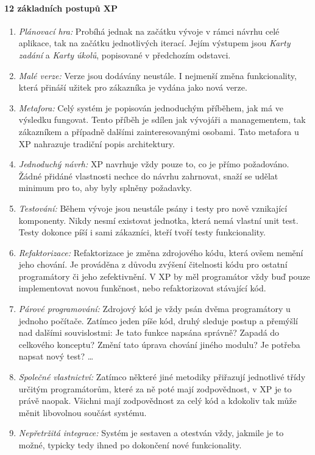 \paragraph{12 základních postupů XP}
\begin{enumerate}
	\item \emph{Plánovací hra:} Probíhá jednak na začátku vývoje v rámci návrhu celé aplikace, tak na začátku jednotlivých iterací. Jejím výstupem jsou \emph{Karty zadání} a \emph{Karty úkolů}, popisované v předchozím odstavci.
	\item \emph{Malé verze:} Verze jsou dodávány neustále. I nejmenší změna funkcionality, která přináší užitek pro zákazníka je vydána jako nová verze.
	\item \emph{Metafora:} Celý systém je popisován jednoduchým příběhem, jak má ve výsledku fungovat. Tento příběh je sdílen jak vývojáři a managementem, tak zákazníkem a případně dalšími zainteresovanými osobami. Tato metafora u XP nahrazuje tradiční popis architektury.
	\item \emph{Jednoduchý návrh:} XP navrhuje vždy pouze to, co je přímo požadováno. Žádné přidáné vlastnosti nechce do návrhu zahrnovat, snaží se udělat minimum pro to, aby byly splněny požadavky.
	\item \emph{Testování:} Během vývoje jsou neustále psány i testy pro nově vznikající komponenty. Nikdy nesmí existovat jednotka, která nemá vlastní unit test. Testy dokonce píší i sami zákazníci, kteří tvoří testy funkcionality.
	\item \emph{Refaktorizace:} Refaktorizace je změna zdrojového kódu, která ovšem nemění jeho chování. Je prováděna z důvodu zvýšení čitelnosti kódu pro ostatní programátory či jeho zefektivnění. V XP by měl programátor vždy buď pouze implementovat novou funkčnost, nebo refaktorizovat stávající kód.
	\item \emph{Párové programování:} Zdrojový kód je vždy psán dvěma programátory u jednoho počítače. Zatímco jeden píše kód, druhý sleduje postup a přemýšlí nad dalšími souvislostmi: Je tato funkce napsána správně? Zapadá do celkového konceptu? Změní tato úprava chování jiného modulu? Je potřeba napsat nový test? \ldots
	\item \emph{Společné vlastnictví:} Zatímco některé jiné metodiky přiřazují jednotlivé třídy určitým programátorům, které za ně poté mají zodpovědnost, v XP je to právě naopak. Všichni mají zodpovědnost za celý kód a kdokoliv tak může měnit libovolnou součást systému.
	\item \emph{Nepřetržitá integrace:} Systém je sestaven a otestván vždy, jakmile je to možné, typicky tedy ihned po dokončení nové funkcionality.

\end{enumerate}
